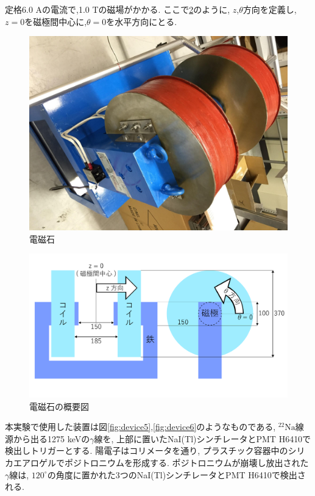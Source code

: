 定格6.0 Aの電流で,1.0 Tの磁場がかかる.
ここで\ref{fig:magnet}のように,
$z$,$\theta$方向を定義し,
$z=0$を磁極間中心に,$\theta=0$を水平方向にとる.


\begin{figure}[H]
\centering
\includegraphics[keepaspectratio,angle=90,scale=0.4]{fig/ybm/mag.pdf}
\caption{電磁石}
\label{fig:mag}
\end{figure}

\begin{figure}[H]
\centering
\includegraphics[keepaspectratio,scale=0.25]{fig/ybm/magnet.pdf}
\caption{電磁石の概要図}
\label{fig:magnet}
\end{figure}

本実験で使用した装置は図\ref{fig:device5},\ref{fig:device6}のようなものである,
$\mathrm{^{22}Na}$線源から出る1275 keVの$\gamma$線を,
上部に置いたNaI(Tl)シンチレータとPMT H6410で検出しトリガーとする.
陽電子はコリメータを通り,
プラスチック容器中のシリカエアロゲルでポジトロニウムを形成する.
ポジトロニウムが崩壊し放出された$\gamma$線は,
$120^{\circ}$の角度に置かれた3つのNaI(Tl)シンチレータとPMT H6410で検出される.

